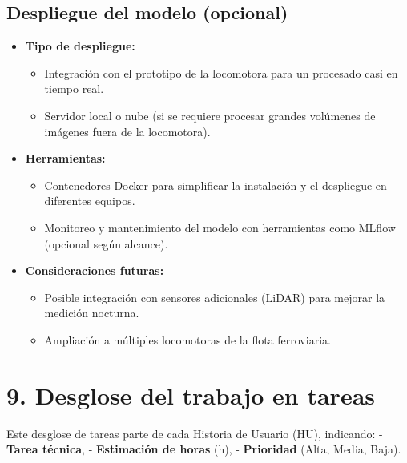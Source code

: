 \documentclass[
11pt, %
]{ProyectoVpC}
\begin{document}
\subsection{Despliegue del modelo (opcional)}
\begin{itemize}
  \item \textbf{Tipo de despliegue:} 
    \begin{itemize}
      \item Integración con el prototipo de la locomotora para un procesado casi en tiempo real.
      \item Servidor local o nube (si se requiere procesar grandes volúmenes de imágenes fuera de la locomotora).
    \end{itemize}
  \item \textbf{Herramientas:} 
    \begin{itemize}
      \item Contenedores Docker para simplificar la instalación y el despliegue en diferentes equipos.
      \item Monitoreo y mantenimiento del modelo con herramientas como MLflow (opcional según alcance).
    \end{itemize}
  \item \textbf{Consideraciones futuras:}
    \begin{itemize}
      \item Posible integración con sensores adicionales (LiDAR) para mejorar la medición nocturna.
      \item Ampliación a múltiples locomotoras de la flota ferroviaria.
    \end{itemize}
\end{itemize}

\section{9. Desglose del trabajo en tareas}

Este desglose de tareas parte de cada Historia de Usuario (HU), indicando: 
- \textbf{Tarea técnica}, 
- \textbf{Estimación de horas} (h), 
- \textbf{Prioridad} (Alta, Media, Baja).
\end{document}
